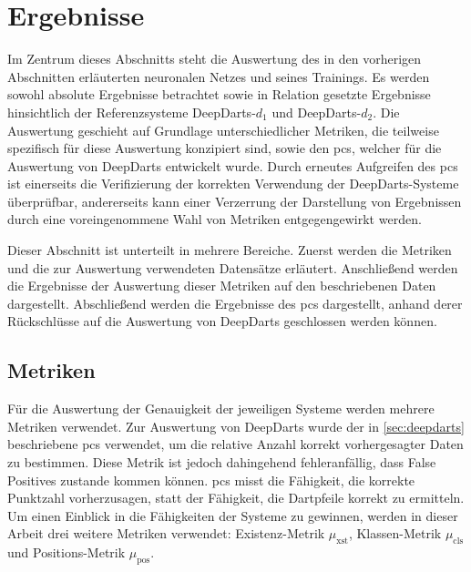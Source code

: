 
\section{Ergebnisse}
\label{sec:ki:ergebnisse}

Im Zentrum dieses Abschnitts steht die Auswertung des in den vorherigen Abschnitten erläuterten neuronalen Netzes und seines Trainings. Es werden sowohl absolute Ergebnisse betrachtet sowie in Relation gesetzte Ergebnisse hinsichtlich der Referenzsysteme DeepDarts-$d_1$ und DeepDarts-$d_2$. Die Auswertung geschieht auf Grundlage unterschiedlicher Metriken, die teilweise spezifisch für diese Auswertung konzipiert sind, sowie den \ac{pcs}, welcher für die Auswertung von DeepDarts entwickelt wurde. Durch erneutes Aufgreifen des \ac{pcs} ist einerseits die Verifizierung der korrekten Verwendung der DeepDarts-Systeme überprüfbar, andererseits kann einer Verzerrung der Darstellung von Ergebnissen durch eine voreingenommene Wahl von Metriken entgegengewirkt werden.

Dieser Abschnitt ist unterteilt in mehrere Bereiche. Zuerst werden die Metriken und die zur Auswertung verwendeten Datensätze erläutert. Anschließend werden die Ergebnisse der Auswertung dieser Metriken auf den beschriebenen Daten dargestellt. Abschließend werden die Ergebnisse des \ac{pcs} dargestellt, anhand derer Rückschlüsse auf die Auswertung von DeepDarts geschlossen werden können.


\subsection{Metriken}
\label{sec:ki_metriken}

Für die Auswertung der Genauigkeit der jeweiligen Systeme werden mehrere Metriken verwendet. Zur Auswertung von DeepDarts wurde der in \autoref{sec:deepdarts} beschriebene \ac{pcs} verwendet, um die relative Anzahl korrekt vorhergesagter Daten zu bestimmen. Diese Metrik ist jedoch dahingehend fehleranfällig, dass False Positives zustande kommen können. \ac{pcs} misst die Fähigkeit, die korrekte Punktzahl vorherzusagen, statt der Fähigkeit, die Dartpfeile korrekt zu ermitteln. Um einen Einblick in die Fähigkeiten der Systeme zu gewinnen, werden in dieser Arbeit drei weitere Metriken verwendet: Existenz-Metrik $\mu_\text{xst}$, Klassen-Metrik $\mu_\text{cls}$ und Positions-Metrik $\mu_\text{pos}$.

